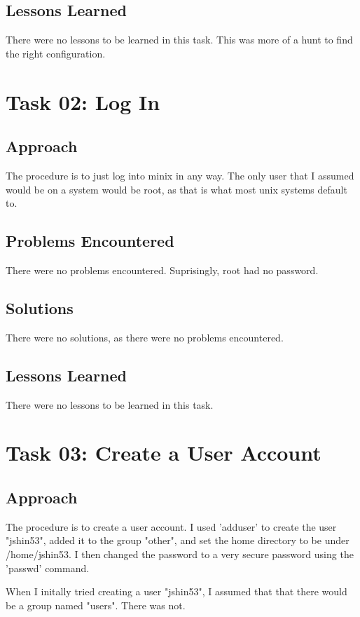 \documentclass[11pt]{article}
\begin{document}
\subsection*{Lessons Learned}
There were no lessons to be learned in this task. This was more of a hunt to find the right configuration.

\section*{Task 02: Log In}
\subsection*{Approach}
The procedure is to just log into minix in any way. The only user that I assumed would be on a system would be root, as that is what most unix systems default to.

\subsection*{Problems Encountered}
There were no problems encountered. Suprisingly, root had no password.

\subsection*{Solutions}
There were no solutions, as there were no problems encountered.

\subsection*{Lessons Learned}
There were no lessons to be learned in this task.

\section*{Task 03: Create a User Account}
\subsection*{Approach}
The procedure is to create a user account. I used 'adduser' to create the user "jshin53", added it to the group "other", and set the home directory to be under /home/jshin53. I then changed the password to a very secure password using the 'passwd' command.

When I initally tried creating a user "jshin53", I assumed that that there would be a group named "users". There was not.
\end{document}
